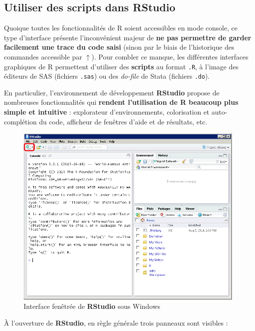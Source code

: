 \documentclass[12pt,twosided, notitlepage]{book}
\begin{document}
\subsection{Utiliser des scripts dans
RStudio}\label{utiliser-des-scripts-dans-rstudio}

Quoique toutes les fonctionnalités de R soient accessibles en mode
console, ce type d'interface présente l'inconvénient majeur de
\textbf{ne pas permettre de garder facilement une trace du code saisi}
(sinon par le biais de l'historique des commandes accessible par
\(\uparrow\)). Pour combler ce manque, les différentes interfaces
graphiques de R permettent d'utiliser des \textbf{scripts} au format
\texttt{.R}, à l'image des éditeurs de SAS (fichiers \texttt{.sas}) ou
des \emph{do-file} de Stata (fichiers \texttt{.do}).

En particulier, l'environnement de développement \textbf{RStudio}
propose de nombreuses fonctionnalités qui \textbf{rendent l'utilisation
de R beaucoup plus simple et intuitive} : explorateur d'environnements,
colorisation et auto-complétion du code, afficheur de fenêtres d'aide et
de résultats, etc.

\begin{figure}
\centering
\includegraphics{../figures/Interface_RStudio_1.png}
\caption{Interface fenêtrée de \textbf{RStudio} sous Windows}
\end{figure}

À l'ouverture de \textbf{RStudio}, en règle générale trois panneaux sont
visibles :
\end{document}
